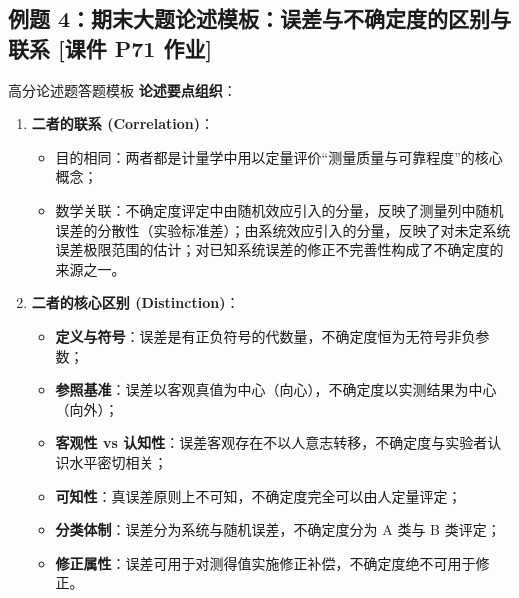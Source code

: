 \documentclass[11pt,a4paper]{ctexart}
\begin{document}
\subsection{例题 4：期末大题论述模板：误差与不确定度的区别与联系 \textnormal{[课件 P71 作业]}}
\begin{solbox}{高分论述题答题模板}
\textbf{论述要点组织}：
\begin{enumerate}
    \item \textbf{二者的联系 (Correlation)}：
    \begin{itemize}
        \item 目的相同：两者都是计量学中用以定量评价“测量质量与可靠程度”的核心概念；
        \item 数学关联：不确定度评定中由随机效应引入的分量，反映了测量列中随机误差的分散性（实验标准差）；由系统效应引入的分量，反映了对未定系统误差极限范围的估计；对已知系统误差的修正不完善性构成了不确定度的来源之一。
    \end{itemize}
    \item \textbf{二者的核心区别 (Distinction)}：
    \begin{itemize}
        \item \textbf{定义与符号}：误差是有正负符号的代数量，不确定度恒为无符号非负参数；
        \item \textbf{参照基准}：误差以客观真值为中心（向心），不确定度以实测结果为中心（向外）；
        \item \textbf{客观性 vs 认知性}：误差客观存在不以人意志转移，不确定度与实验者认识水平密切相关；
        \item \textbf{可知性}：真误差原则上不可知，不确定度完全可以由人定量评定；
        \item \textbf{分类体制}：误差分为系统与随机误差，不确定度分为 A 类与 B 类评定；
        \item \textbf{修正属性}：误差可用于对测得值实施修正补偿，不确定度绝不可用于修正。
    \end{itemize}
\end{enumerate}
\end{solbox}
\end{document}
